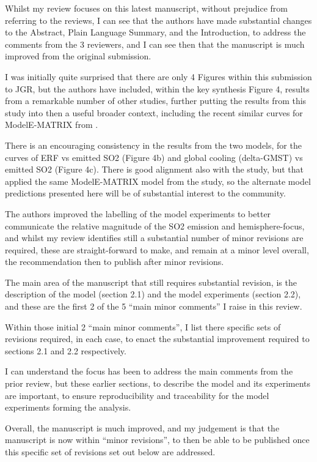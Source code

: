 \documentclass{reviewresponse}
\let\citeA\shortciteA %
\begin{document}
\begin{generalcomment}
    Whilst my review focuses on this latest manuscript, without prejudice from referring
    to the reviews, I can see that the authors have made substantial changes to the
    Abstract, Plain Language Summary, and the Introduction, to address the comments from
    the 3 reviewers, and I can see then that the manuscript is much improved from the
    original submission.

    I was initially quite surprised that there are only 4 Figures within this submission
    to JGR, but the authors have included, within the key synthesis Figure 4, results
    from a remarkable number of other studies, further putting the results from this
    study into then a useful broader context, including the recent similar curves for
    ModelE-MATRIX from \citeA{mcgraw2024}.

    There is an encouraging consistency in the results from the two models, for the
    curves of ERF vs emitted SO2 (Figure 4b) and global cooling (delta-GMST) vs emitted
    SO2 (Figure 4c). There is good alignment also with the \citeA{osipov2020} study, but
    that applied the same ModelE-MATRIX model from the \citeA{mcgraw2024} study, so the
    alternate model predictions presented here will be of substantial interest to the
    community.

    The authors improved the labelling of the model experiments to better communicate
    the relative magnitude of the SO2 emission and hemisphere-focus, and whilst my
    review identifies still a substantial number of minor revisions are required, these
    are straight-forward to make, and remain at a minor level overall, the
    recommendation then to publish after minor revisions.

    The main area of the manuscript that still requires substantial revision, is the
    description of the model (section 2.1) and the model experiments (section 2.2), and
    these are the first 2 of the 5 ``main minor comments'' I raise in this review.

    Within those initial 2 ``main minor comments'', I list there specific sets of
    revisions required, in each case, to enact the substantial improvement required to
    sections 2.1 and 2.2 respectively.

    I can understand the focus has been to address the main comments from the prior
    review, but these earlier sections, to describe the model and its experiments are
    important, to ensure reproducibility and traceability for the model experiments
    forming the analysis.

    Overall, the manuscript is much improved, and my judgement is that the manuscript is
    now within ``minor revisions'', to then be able to be published once this specific
    set of revisions set out below are addressed.
  \end{generalcomment}
\end{document}
